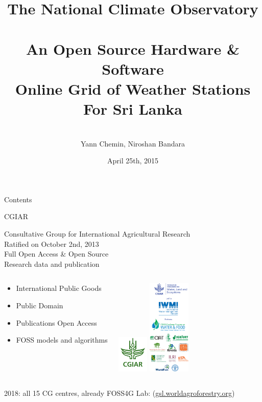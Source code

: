 \documentclass[xcolor=dvipsnames,beamer]{beamer} %
\title[FOSS4G - OSHW]
{The National Climate Observatory\\
\ \\
An Open Source Hardware \& Software\\
Online Grid of Weather Stations\\
For Sri Lanka}
\author[Chemin, Bandara]
{\vspace{30pt}\\
Yann Chemin, Niroshan Bandara}
\institute[IWMI - U of Moratuwa]
{International Water Management Institute\\
 \vspace{5pt}
University of Moratuwa, Faculty of Architecture
\begin{center}
\end{center}
}
\date{\tiny April 25th, 2015}
\begin{document}
\begin{frame}
 \maketitle
\end{frame}

\begin{frame}{Contents}
 \begin{multicols}{2}
  \setcounter{tocdepth}{2}  
  \tableofcontents
 \end{multicols} 
\end{frame}

\begin{frame}[fragile]{CGIAR}

Consultative Group for International Agricultural Research\\
Ratified on October 2nd, 2013\\
Full Open Access \& Open Source\\
Research data and publication

\begin{columns}
\begin{center}
\begin{itemize}
 \item International Public Goods
 \item Public Domain
 \item Publications Open Access
 \item FOSS models and algorithms
\end{itemize}
\end{center}

\begin{center}
  \includegraphics[width=1.5cm]{CGIAR_Green}
  \hspace{5mm}
  \includegraphics[width=2cm]{WLE_and_partners-vertical_logo_strip.png}
\end{center}
\end{columns}
\vspace{5mm} 2018: all 15 CG centres, already FOSS4G Lab:
(\href{http://gsl.worldagroforestry.org}{gsl.worldagroforestry.org})
\end{frame}
\end{document}
